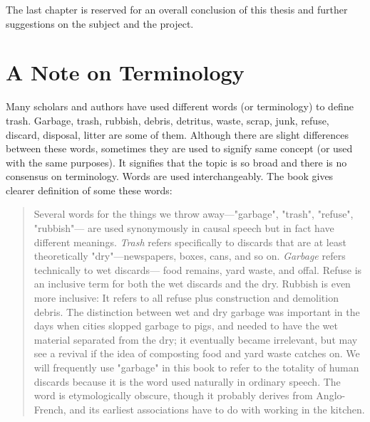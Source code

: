 The last chapter is reserved for an overall conclusion of this thesis and further suggestions on the subject and the project.





%
\section{A Note on Terminology}
Many scholars and authors have used different words (or terminology) to define trash. Garbage, trash, rubbish, debris, detritus, waste, scrap, junk, refuse, discard, disposal, litter are some of them. Although there are slight differences between these words, sometimes they are used to signify same concept (or used with the same purposes). It signifies that the topic is so broad and there is no consensus on terminology. Words are used interchangeably. The book  gives clearer definition of some these words:


\begin{quote}
Several words for the things we throw away---"garbage", "trash", "refuse", "rubbish"--- are used synonymously in causal speech but in fact have different meanings. \textit{Trash} refers specifically to discards that are at least theoretically "dry"---newspapers, boxes, cans, and so on. \textit{Garbage} refers technically to wet discards--- food remains, yard waste, and offal. Refuse is an inclusive term for both the wet discards and the dry. Rubbish is even more inclusive: It refers to all refuse plus construction and demolition debris. The distinction between wet and dry garbage was important in the days when cities slopped garbage to pigs, and needed to have the wet material separated from the dry; it eventually became irrelevant, but may see a revival if the idea of composting food and yard waste catches on. We will frequently use "garbage" in this book to refer to the totality of human discards because it is the word used naturally in ordinary speech. The word is etymologically obscure, though it probably derives from Anglo-French, and its earliest associations have to do with working in the kitchen. \citep[9]{rathje1992rubbish}
\end{quote}


